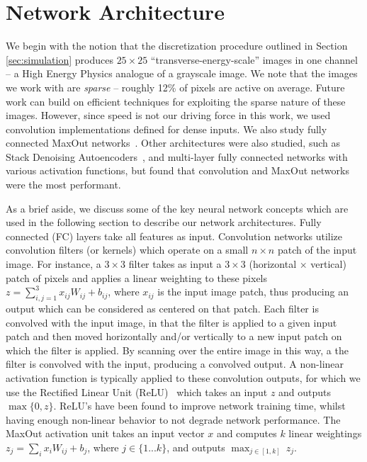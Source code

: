 
\section{Network Architecture}
\label{sec:arch}


We begin with the notion that the discretization procedure outlined in Section \ref{sec:simulation} produces $25\times 25$ ``transverse-energy-scale'' images in one channel -- a High Energy Physics analogue of a grayscale image. We note that the images we work with are \emph{sparse} -- roughly 12\% of pixels are active on average. Future work can build on efficient techniques for exploiting the sparse nature of these images. However, since speed is not our driving force in this work, we used convolution implementations defined for dense inputs.  We also study fully connected MaxOut networks~\cite{maxout:goodfellow}.  Other architectures were also studied, such as Stack Denoising Autoencoders~\cite{SDAE}, and multi-layer fully connected networks with various activation functions, but found that convolution and MaxOut networks were the most performant.

As a brief aside, we discuss some of the key neural network concepts which are used in the following section to describe our network architectures.  Fully connected (FC) layers take all features as input.  Convolution networks utilize convolution filters (or kernels) which operate on a small $n\times n$ patch of the input image.  For instance, a $3\times3$ filter takes as input a $3\times3$ (horizontal $\times$ vertical) patch of pixels and applies a linear weighting to these pixels $z = \sum_{i,j=1}^{3} x_{ij}W_{ij} + b_{ij}$, where $x_{ij}$ is the input image patch, thus producing an output which can be considered as centered on that patch.  Each filter is convolved with the input image, in that the filter is applied to a given input patch and then moved horizontally and/or vertically to a new input patch on which the filter is applied.  By scanning over the entire image in this way, a the filter is convolved with the input, producing a convolved output.  A non-linear activation function is typically applied to these convolution outputs, for which we use the Rectified Linear Unit (ReLU)~\cite{RELU} which takes an input $z$ and outputs $\max\{0,z\}$. ReLU's have been found to improve network training time, whilst having enough non-linear behavior to not degrade network performance.    The MaxOut activation unit takes an input vector $x$ and computes $k$ linear weightings $z_{j} = \sum_{i} x_{i} W_{ij} + b_{j}$, where $j\in \{1...k\}$, and  outputs $\max_{j\in [1,k]}\ z_{j}$.  


